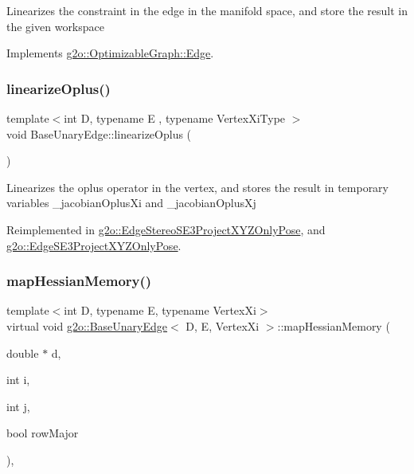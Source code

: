 Linearizes the constraint in the edge in the manifold space, and store the result in the given workspace 

Implements \mbox{\hyperlink{classg2o_1_1_optimizable_graph_1_1_edge_a0fdad5ebfb4efec9f893b57f67e0fbe1}{g2o\+::\+Optimizable\+Graph\+::\+Edge}}.

\mbox{\label{classg2o_1_1_base_unary_edge_a367f19b903938faf6e89dd1b0e4e722b}} 
\subsubsection{\texorpdfstring{linearize\+Oplus()}{linearizeOplus()}\hspace{0.1cm}{\footnotesize\ttfamily [2/2]}}
{\footnotesize\ttfamily template$<$int D, typename E , typename Vertex\+Xi\+Type $>$ \\
void Base\+Unary\+Edge\+::linearize\+Oplus (\begin{DoxyParamCaption}{ }\end{DoxyParamCaption})\hspace{0.3cm}{\ttfamily [virtual]}}

Linearizes the oplus operator in the vertex, and stores the result in temporary variables \+\_\+jacobian\+Oplus\+Xi and \+\_\+jacobian\+Oplus\+Xj 

Reimplemented in \mbox{\hyperlink{classg2o_1_1_edge_stereo_s_e3_project_x_y_z_only_pose_a0b2b815e8ae331276f33be374dcc1897}{g2o\+::\+Edge\+Stereo\+S\+E3\+Project\+X\+Y\+Z\+Only\+Pose}}, and \mbox{\hyperlink{classg2o_1_1_edge_s_e3_project_x_y_z_only_pose_abe6d775aade1277786274c328aa2c38b}{g2o\+::\+Edge\+S\+E3\+Project\+X\+Y\+Z\+Only\+Pose}}.

\mbox{\label{classg2o_1_1_base_unary_edge_a919dcb89130f6e7082e807530facdd78}} 
\subsubsection{\texorpdfstring{map\+Hessian\+Memory()}{mapHessianMemory()}}
{\footnotesize\ttfamily template$<$int D, typename E, typename Vertex\+Xi$>$ \\
virtual void \mbox{\hyperlink{classg2o_1_1_base_unary_edge}{g2o\+::\+Base\+Unary\+Edge}}$<$ D, E, Vertex\+Xi $>$\+::map\+Hessian\+Memory (\begin{DoxyParamCaption}\item[{double $\ast$}]{d,  }\item[{int}]{i,  }\item[{int}]{j,  }\item[{bool}]{row\+Major }\end{DoxyParamCaption})\hspace{0.3cm}{\ttfamily [inline]}, {\ttfamily [virtual]}}

